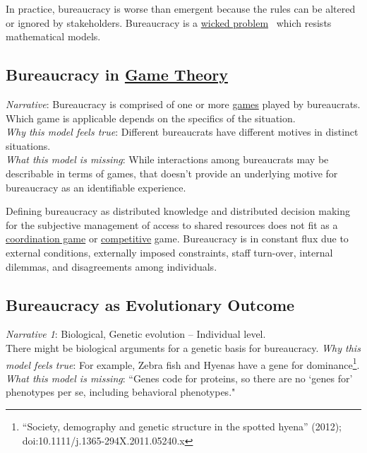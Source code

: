 In practice, bureaucracy is worse than emergent because the rules can be altered or ignored by  stakeholders. Bureaucracy is a \href{https://en.wikipedia.org/wiki/Wicked_problem}{wicked problem}~\cite{1973_Rittel} 
which resists mathematical models. 

\subsection*{Bureaucracy in \href{https://en.wikipedia.org/wiki/Game_theory}{Game Theory}}
\textit{Narrative}: Bureaucracy is comprised of one or more \href{https://en.wikipedia.org/wiki/List_of_games_in_game_theory}{games} 
played by bureaucrats. Which game is applicable depends on the specifics of the situation. \\
\textit{Why this model feels true}: Different bureaucrats have different motives in distinct situations. \\
\textit{What this model is missing}: While interactions among bureaucrats may be describable in terms of games, that doesn't provide an underlying motive for bureaucracy as an identifiable experience.  

Defining bureaucracy as distributed knowledge and distributed decision making for the subjective management of access to shared resources does not fit as a \href{https://en.wikipedia.org/wiki/Coordination_game}{coordination game} 
or \href{https://en.wikipedia.org/wiki/Non-cooperative_game_theory}{competitive} game. 
Bureaucracy is in constant flux due to external conditions, externally imposed constraints, staff turn-over, internal dilemmas, and disagreements among individuals. 




\subsection*{Bureaucracy as Evolutionary Outcome}


\textit{Narrative 1}: Biological, Genetic evolution -- Individual level. \\
There might be biological arguments for a genetic basis for bureaucracy. 
\textit{Why this model feels true}: For example, Zebra fish and Hyenas have a gene for dominance\footnote{``Society, demography and genetic structure in the spotted hyena'' (2012); doi:10.1111/j.1365-294X.2011.05240.x}. \\
\textit{What this model is missing}: ``Genes code for proteins, so there are no `genes for' phenotypes per se, including behavioral phenotypes." \cite{2015_Lilienfeld}


